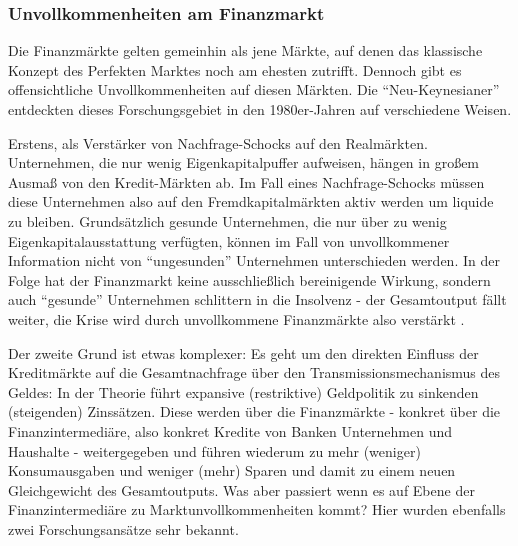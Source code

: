 \subsubsection{Unvollkommenheiten am Finanzmarkt}
Die Finanzmärkte gelten gemeinhin als jene Märkte, auf denen das klassische Konzept des Perfekten Marktes noch am ehesten zutrifft. Dennoch gibt es offensichtliche Unvollkommenheiten auf diesen Märkten. Die "`Neu-Keynesianer"' entdeckten dieses Forschungsgebiet in den 1980er-Jahren auf verschiedene Weisen. 

Erstens, als Verstärker von Nachfrage-Schocks auf den Realmärkten. Unternehmen, die nur wenig Eigenkapitalpuffer aufweisen, hängen in großem Ausmaß von den Kredit-Märkten ab. Im Fall eines Nachfrage-Schocks müssen diese Unternehmen also auf den Fremdkapitalmärkten aktiv werden um liquide zu bleiben. Grundsätzlich gesunde Unternehmen, die nur über zu wenig Eigenkapitalausstattung verfügten, können im Fall von unvollkommener Information nicht von "`ungesunden"' Unternehmen unterschieden werden. In der Folge hat der Finanzmarkt keine ausschließlich bereinigende Wirkung, sondern auch "`gesunde"' Unternehmen schlittern in die Insolvenz - der Gesamtoutput fällt weiter, die Krise wird durch unvollkommene Finanzmärkte also verstärkt \parencite[S. 13]{Mankiw1991}.
  
Der zweite Grund ist etwas komplexer: Es geht um den direkten Einfluss der Kreditmärkte auf die Gesamtnachfrage über den Transmissionsmechanismus des Geldes: In der Theorie führt expansive (restriktive) Geldpolitik zu sinkenden (steigenden) Zinssätzen. Diese werden über die Finanzmärkte - konkret über die Finanzintermediäre, also konkret Kredite von Banken Unternehmen und Haushalte - weitergegeben und führen wiederum zu mehr (weniger) Konsumausgaben und weniger (mehr) Sparen und damit zu einem neuen Gleichgewicht des Gesamtoutputs. Was aber passiert wenn es auf Ebene der Finanzintermediäre zu Marktunvollkommenheiten kommt? Hier wurden ebenfalls zwei Forschungsansätze sehr bekannt. 

